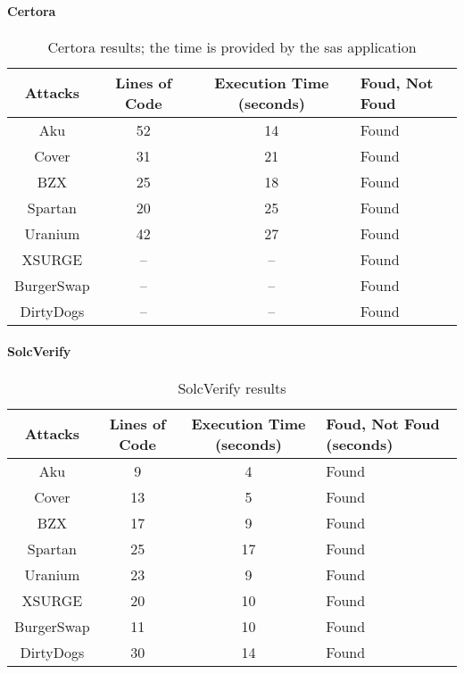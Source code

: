 \paragraph{Certora}

\begin{center}
    \begin{table*}
        \caption{Certora results; the time is provided by the sas application}
            \label{tab:CertoraTable}
            \begin{tabular}{cccl}
            \toprule
                Attacks & Lines of Code & Execution Time (seconds) & Foud, Not Foud\\
                \midrule
                Aku & 52 & 14 & Found \\ 
                Cover & 31 & 21 & Found\\ 
                BZX & 25  & 18 & Found\\ 
                Spartan & 20  & 25 & Found\\ 
                Uranium & 42 & 27  & Found\\ 
                XSURGE &  -- & -- & Found\\  
                BurgerSwap &  -- & --& Found\\ 
                DirtyDogs &  -- & -- & Found\\
            \bottomrule
            \end{tabular}
    \end{table*}
\end{center}

\paragraph{SolcVerify}

\begin{center}
    \begin{table*}
        \caption{SolcVerify results}
                \label{tab:SolcVerifyTable}
                \begin{tabular}{cccl}
                \toprule
                    Attacks & Lines of Code & Execution Time (seconds) & Foud, Not Foud (seconds)\\
                    \midrule
                    Aku & 9 & 4 & Found \\ 
                    Cover & 13  & 5 & Found \\ 
                    BZX & 17  & 9  & Found \\ 
                    Spartan & 25 &  17 & Found \\ 
                    Uranium  &  23 & 9 & Found \\ 
                    XSURGE & 20 & 10 & Found \\  
                    BurgerSwap & 11 & 10  & Found \\ 
                    DirtyDogs &  30 &  14& Found \\
                \bottomrule
        \end{tabular}
    \end{table*}
    
\end{center}
